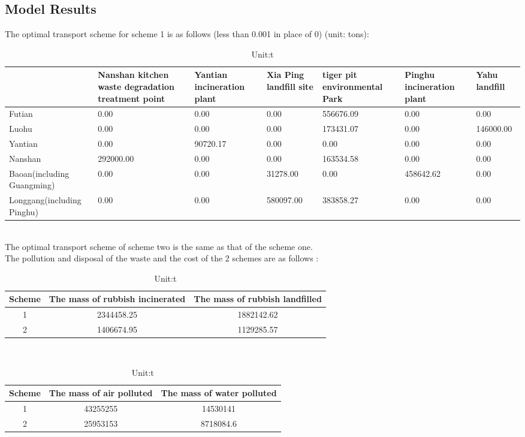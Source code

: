 \documentclass[UTF8]{article}
\begin{document}
\subsection{Model Results}
\indent The optimal transport scheme for scheme 1 is as follows (less than 0.001 in place of 0) (unit: tons):\\
\begin{table}
\caption{Unit:t}
\begin{center}
\begin{tabular}{p{4cm}p{2cm}p{2cm}p{2cm}p{2cm}p{2cm}p{2cm}}
\hline
&Nanshan kitchen waste degradation treatment point & Yantian incineration plant & Xia Ping landfill site&tiger pit environmental Park & Pinghu incineration plant &Yahu landfill \\
\hline
Futian&0.00 &0.00 &0.00 &556676.09 &0.00 &0.00\\
\hline
Luohu&0.00 &0.00 &0.00 &173431.07 &0.00 &146000.00\\
\hline
Yantian&0.00 &90720.17 &0.00 &0.00 &0.00 &0.00\\
\hline
Nanshan&292000.00 &0.00 &0.00 &163534.58 &0.00 &0.00\\
\hline
Baoan(including Guangming)&0.00 &0.00 &31278.00 &0.00 &458642.62 &0.00\\
\hline
Longgang(including Pinghu)&0.00 &0.00 &580097.00 &383858.27 &0.00 &0.00\\
\hline
\end{tabular}
\end{center}
\end{table}\\
\indent The optimal transport scheme of scheme two is the same as that of the scheme one.\\
\indent The pollution and disposal of the waste and the cost of the 2 schemes are as follows :\\
\begin{table}
\caption{Unit:t}
\begin{center}
\begin{tabular}{ccc}
\hline
Scheme&The mass of rubbish incinerated&The mass of rubbish landfilled\\
\hline
1&2344458.25&1882142.62\\
\hline
2&1406674.95&1129285.57\\
\hline
\end{tabular}
\end{center}
\end{table}\\
\begin{table}
\caption{Unit:t}
\begin{center}
\begin{tabular}{ccc}
\hline
Scheme&The mass of air polluted&The mass of water polluted\\
\hline
1&43255255&14530141\\
\hline
2&25953153&8718084.6\\
\hline
\end{tabular}
\end{center}
\end{table}\\
\end{document}
